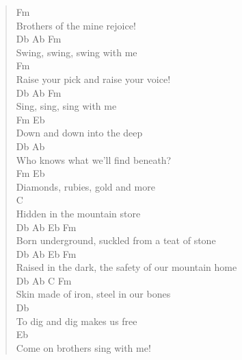 \documentclass[11pt]{article}
\begin{document}
\begin{verse}
Fm\\
Brothers of the mine rejoice!\\
\vspace*{1em}
Db    Ab               Fm\\
Swing, swing, swing with me\\
\vspace*{1em}
Fm\\
Raise your pick and raise your voice!\\
\vspace*{1em}
Db   Ab             Fm\\
Sing, sing, sing with me\\
\vspace*{1em}
Fm            Eb\\
Down and down into the deep\\
\vspace*{1em}
Db                  Ab\\
Who knows what we'll find beneath?\\
\vspace*{1em}
Fm                Eb\\
Diamonds, rubies, gold and more\\
\vspace*{1em}
C\\
Hidden in the mountain store\\
\vspace*{1em}
\vspace*{1em}
Db          Ab     Eb            Fm\\
Born underground, suckled from a teat of stone\\
\vspace*{1em}
Db          Ab           Eb            Fm\\
Raised in the dark, the safety of our mountain home\\
\vspace*{1em}
Db         Ab       C            Fm\\
Skin made of iron, steel in our bones\\
\vspace*{1em}
Db\\
To dig and dig makes us free\\
\vspace*{1em}
Eb\\
Come on brothers sing with me!\\
\vspace*{1em}
\vspace*{1em}

\end{verse}
\end{document}
